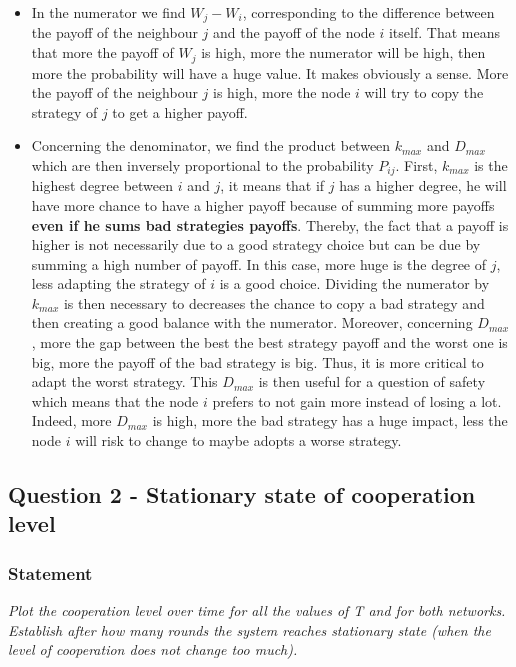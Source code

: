\documentclass{article}
\begin{document}
\begin{itemize}
\item In the numerator we find $W_{j} - W_{i}$, corresponding to the difference between the payoff of the neighbour $j$ and the payoff of the node $i$ itself. That means that more the payoff of $W_{j}$ is high, more the numerator will be high, then more the probability will have a huge value. It makes obviously a sense. More the payoff of the neighbour $j$ is high, more the node $i$ will try to copy the strategy of $j$ to get a higher payoff. 
\item Concerning the denominator, we find the product between $k_{max}$ and $D_{max}$ which are then inversely proportional to the probability $P_{ij}$. First, $k_{max}$ is the highest degree between $i$ and $j$, it means that if $j$ has a higher degree, he will have more chance to have a higher payoff because of summing more payoffs \textbf{even if he sums bad strategies payoffs}. Thereby, the fact that a payoff is higher is not necessarily due to a good strategy choice but can be due by summing a high number of payoff. In this case, more huge is the degree of $j$, less adapting the strategy of $i$ is a good choice. Dividing the numerator by $k_{max}$ is then necessary to decreases the chance to copy a bad strategy and then creating a good balance with the numerator.  
Moreover, concerning $D_{max}$, more the gap between the best the best strategy payoff and the worst one is big, more the payoff of the bad strategy is big. Thus, it is more critical to adapt the worst strategy. This $D_{max}$ is then useful for a question of safety which means that the node $i$ prefers to not gain more instead of losing a lot. Indeed, more $D_{max}$ is high, more the bad strategy has a huge impact, less the node $i$ will risk to change to maybe adopts a worse strategy.  
\end{itemize}

\subsection{Question 2 - Stationary state of cooperation level}

\subsubsection*{Statement}
\textit{Plot the cooperation level over time for all the values of T and for both networks. Establish after how many rounds the system reaches stationary state (when the level of cooperation does not change too much).}
\end{document}
